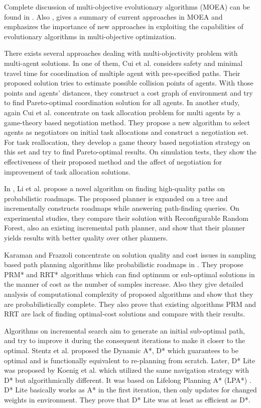 \documentclass[10pt,journal]{IEEEtran}
\begin{document}
Complete discussion of multi-objective evolutionary algorithms (MOEA) can be found in \cite{MOOUEA}. Also \cite{Coello:2000}, gives a summary of current approaches in MOEA and emphasizes the importance of new approaches in exploiting the capabilities of evolutionary algorithms in multi-objective optimization.

There exists several approaches dealing with multi-objectivity problem with multi-agent solutions. In one of them, Cui et al. \cite{Cui:2012} considers safety and minimal travel time for coordination of multiple agent with pre-specified paths. Their proposed solution tries to estimate possible collision points of agents. With those points and agents' distances, they construct a cost graph of environment and try to find Pareto-optimal coordination solution for all agents. In another study, again Cui et al. \cite{Cui:2013} concentrate on task allocation problem for multi agents by a game-theory based negotiation method. They propose a new algorithm to select agents as negotiators on initial task allocations and construct a negotiation set. For task reallocation, they develop a game theory based negotiation strategy on this set and try to find Pareto-optimal results. On simulation tests, they show the effectiveness of their proposed method and the affect of negotiation for improvement of task allocation solutions.

In \cite{Li_KOrder:2014}, Li et al. propose a novel algorithm on finding high-quality paths on probabilistic roadmaps. The proposed planner is expanded on a tree and incrementally constructs roadmaps while answering path-finding queries. On experimental studies, they compare their solution with Reconfigurable Random Forest, also an existing incremental path planner, and show that their planner yields results with better quality over other planners.

Karaman and Frazzoli concentrate on solution quality and cost issues in sampling based path planning algorithms like probabilistic roadmaps in \cite{Karaman:2011}. They propose PRM* and RRT* algorithms which can find optimum or sub-optimal solutions in the manner of cost as the number of samples increase. Also they give detailed analysis of computational complexity of proposed algorithms and show that they are probabilistically complete. They also prove that existing algorithms PRM and RRT are lack of finding optimal-cost solutions and compare with their results.

Algorithms on incremental search aim to generate an initial sub-optimal path, and try to improve it during the consequent iterations to make it closer to the optimal. Stentz et al. proposed the Dynamic A*, D* \cite{DStar:1994} which guarantees to be optimal and is functionally equivalent to re-planning from scratch. Later, D* Lite was proposed by Koenig et al. \cite{Koenig:2002} which utilized the same navigation strategy with D* but algorithmically different. It was based on Lifelong Planning A* (LPA*) \cite{LPAStarKoenig:2004}. D* Lite basically works as A* in the first iteration, then only updates for changed weights in environment. They prove that D* Lite was at least as efficient as D*.
\end{document}
